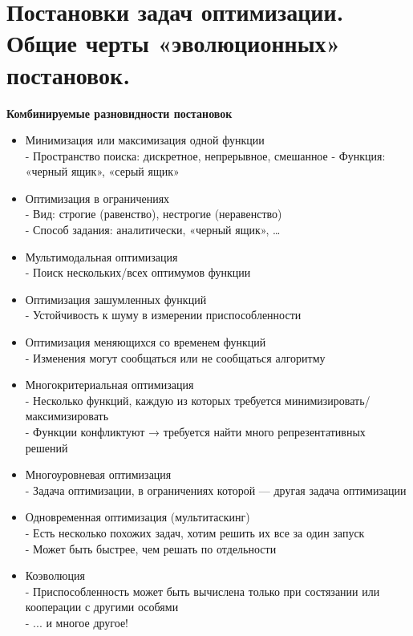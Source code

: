 \section{Постановки задач оптимизации. Общие черты «эволюционных» постановок.}
\begin{center}
     \textbf{Комбинируемые разновидности постановок\\}
\end{center}
\begin{itemize}
\item Минимизация или максимизация одной функции\\
- Пространство поиска: дискретное, непрерывное, смешанное
- Функция: «черный ящик», «серый ящик»
\item Оптимизация в ограничениях\\
- Вид: строгие (равенство), нестрогие (неравенство)\\
- Способ задания: аналитически, «черный ящик», …
\item Мультимодальная оптимизация\\
- Поиск нескольких/всех оптимумов функции
\item Оптимизация зашумленных функций \\
- Устойчивость к шуму в измерении приспособленности
\item Оптимизация меняющихся со временем функций\\
- Изменения могут сообщаться или не сообщаться алгоритму
\item Многокритериальная оптимизация\\
- Несколько функций, каждую из которых требуется минимизировать/максимизировать\\
- Функции конфликтуют → требуется найти много репрезентативных решений
\item Многоуровневая оптимизация\\
- Задача оптимизации, в ограничениях которой — другая задача оптимизации
\item Одновременная оптимизация (мультитаскинг)\\
- Есть несколько похожих задач, хотим решить их все за один запуск\\
- Может быть быстрее, чем решать по отдельности
\item Коэволюция\\
- Приспособленность может быть вычислена только при состязании или кооперации с другими особями \\
- ... и многое другое!\\
\end{itemize}

